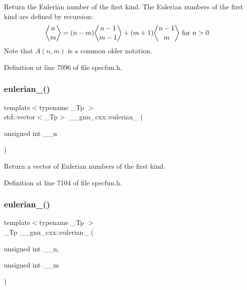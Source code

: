 Return the Eulerian number of the first kind. The Eulerian numbers of the first kind are defined by recursion\+: \[ \genfrac{\langle}{\rangle}{0pt}{0}{n}{m} = (n-m)\genfrac{\langle}{\rangle}{0pt}{0}{n-1}{m-1} + (m+1)\genfrac{\langle}{\rangle}{0pt}{0}{n-1}{m} \mbox{ for } n > 0 \] Note that $ A(n,m) $ is a common older notation. 

Definition at line 7096 of file specfun.\+h.

\mbox{\label{group__gnu__math__spec__func_ga6597229d2557ccf12fd9c50a66919ceb}} 
\subsubsection{\texorpdfstring{eulerian\+\_()}{eulerian\_1()}\hspace{0.1cm}{\footnotesize\ttfamily [2/2]}}
{\footnotesize\ttfamily template$<$typename \+\_\+\+Tp $>$ \\
std\+::vector$<$\+\_\+\+Tp$>$ \+\_\+\+\_\+gnu\+\_\+cxx\+::eulerian\+\_ (\begin{DoxyParamCaption}\item[{unsigned int}]{\+\_\+\+\_\+n }\end{DoxyParamCaption})\hspace{0.3cm}{\ttfamily [inline]}}

Return a vector of Eulerian numbers of the first kind. 

Definition at line 7104 of file specfun.\+h.

\mbox{\label{group__gnu__math__spec__func_ga9bc456941d5e35cf54ec9c50f2e52884}} 
\subsubsection{\texorpdfstring{eulerian\+\_()}{eulerian\_2()}}
{\footnotesize\ttfamily template$<$typename \+\_\+\+Tp $>$ \\
\+\_\+\+Tp \+\_\+\+\_\+gnu\+\_\+cxx\+::eulerian\+\_ (\begin{DoxyParamCaption}\item[{unsigned int}]{\+\_\+\+\_\+n,  }\item[{unsigned int}]{\+\_\+\+\_\+m }\end{DoxyParamCaption})\hspace{0.3cm}{\ttfamily [inline]}}

